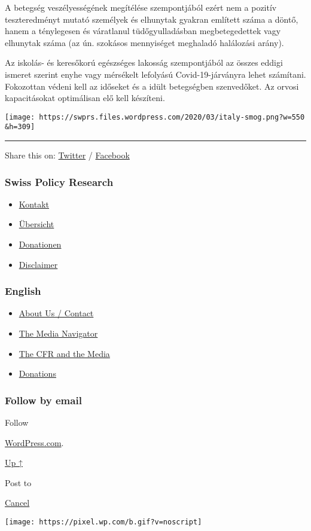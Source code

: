 A betegség veszélyességének megítélése szempontjából ezért nem a pozitív
teszteredményt mutató személyek és elhunytak gyakran említett száma a
döntő, hanem a ténylegesen és váratlanul tüdőgyulladásban
megbetegedettek vagy elhunytak száma (az ún. szokásos mennyiséget
meghaladó halálozási arány).

Az iskolás- és keresőkorú egészséges lakosság szempontjából az összes
eddigi ismeret szerint enyhe vagy mérsékelt lefolyású Covid-19-járványra
lehet számítani. Fokozottan védeni kell az időseket és a idült
betegségben szenvedőket. Az orvosi kapacitásokat optimálisan elő kell
készíteni.

\texttt{[image: https://swprs.files.wordpress.com/2020/03/italy-smog.png?w=550\\\&h=309]}

\begin{center}\rule{0.5\linewidth}{\linethickness}\end{center}

Share this on:
\href{https://twitter.com/intent/tweet?url=https://swprs.org/egy-svajci-orvos-a-covid-19-rol/}{Twitter}
/
\href{https://www.facebook.com/share.php?u=https://swprs.org/egy-svajci-orvos-a-covid-19-rol/}{Facebook}

\hypertarget{swiss-policy-research}{%
\subsubsection{Swiss Policy Research}\label{swiss-policy-research}}

\begin{itemize}
\tightlist
\item
  \href{https://swprs.org/kontakt/}{Kontakt}
\item
  \href{https://swprs.org/uebersicht/}{Übersicht}
\item
  \href{https://swprs.org/donationen/}{Donationen}
\item
  \href{https://swprs.org/disclaimer/}{Disclaimer}
\end{itemize}

\hypertarget{english}{%
\subsubsection{English}\label{english}}

\begin{itemize}
\tightlist
\item
  \href{https://swprs.org/contact/}{About Us / Contact}
\item
  \href{https://swprs.org/media-navigator/}{The Media Navigator}
\item
  \href{https://swprs.org/the-american-empire-and-its-media/}{The CFR
  and the Media}
\item
  \href{https://swprs.org/donations/}{Donations}
\end{itemize}

\hypertarget{follow-by-email}{%
\subsubsection{Follow by email}\label{follow-by-email}}

Follow

\href{https://wordpress.com/?ref=footer_custom_com}{WordPress.com}.

\protect\hyperlink{}{Up ↑}

Post to

\protect\hyperlink{}{Cancel}

\texttt{[image: https://pixel.wp.com/b.gif?v=noscript]}
